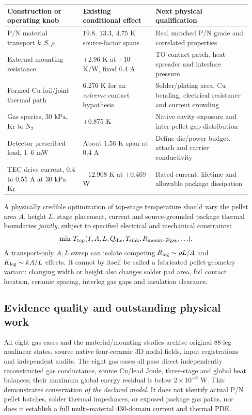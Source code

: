 \begin{center}\small
\begin{tabularx}{\linewidth}{p{42mm}p{33mm}X}\toprule
Construction or operating knob & Existing conditional effect & Next physical qualification\\\midrule
P/N material transport \(k,S,\rho\) &
\(19.8,\ 13.3,\ 4.75\) K source-factor spans &
Real matched P/N grade and correlated properties\\
External mounting resistance &
+2.96 K at +10 K/W, fixed 0.4 A &
TO contact patch, heat spreader and interface pressure\\
Formed-Cu foil/joint thermal path &
6.276 K for an \emph{extreme} contact hypothesis &
Solder/plating area, Cu bending, electrical resistance and current crowding\\
Gas species, 30 kPa, Kr to N$_2$ &
+0.875 K &
Native cavity exposure and inter-pellet gap distribution\\
Detector prescribed load, 1--6 mW &
About 1.56 K span at 0.4 A &
Define die/power budget, attach and carrier conductivity\\
TEC drive current, 0.4 to 0.55 A at 30 kPa Kr &
\(-12.908\) K at \(+0.469\) W &
Rated current, lifetime and allowable package dissipation\\\bottomrule
\end{tabularx}
\end{center}

A physically credible optimization of top-stage temperature should vary
the pellet area \(A\), height \(L\), stage placement, current and
source-grounded package thermal boundaries \emph{jointly}, subject to
specified electrical and mechanical constraints:
\[
\min\,T_{\rm top}(I,A,L,Q_{\rm die},T_{\rm sink},
R_{\rm mount},p_{\rm gas},\ldots).
\]
A transport-only \(A,L\) sweep can isolate competing
\(R_{\rm leg}\sim \rho L/A\) and \(K_{\rm leg}\sim kA/L\)
effects. It cannot by itself be called a fabricated
pellet-geometry variant: changing width or height also changes
solder pad area, foil contact location, ceramic spacing,
interleg gas gaps and insulation clearance.

\subsection{Evidence quality and outstanding physical work}
All eight gas cases and the material/mounting studies archive
original 88-leg nonlinear states, source native four-ceramic
3D nodal fields, input registrations and independent audits.
The eight gas cases all pass direct independently
reconstructed gas conductance, source Cu/lead Joule,
three-stage and global heat balances; their maximum
global energy residual is below \(2\times10^{-9}\) W.
This demonstrates conservation \emph{of the declared model}.
It does not identify actual P/N pellet batches,
solder thermal impedances, or exposed package gas
paths, nor does it establish a full multi-material
430-domain current and thermal PDE.

